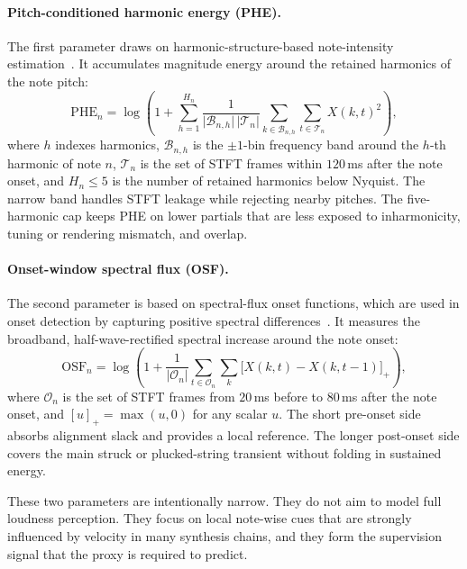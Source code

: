 \paragraph{Pitch-conditioned harmonic energy (PHE).}
The first parameter draws on harmonic-structure-based note-intensity estimation~\cite{ewert2011est}. It accumulates magnitude energy around the retained harmonics of the note pitch:
\begin{equation}
\label{eq:bp_phe}
\mathrm{PHE}_n =
\log\!\left(1 + \sum_{h=1}^{H_n}
\frac{1}{\lvert\mathcal{B}_{n,h}\rvert\,\lvert\mathcal{T}_n\rvert}
\sum_{k \in \mathcal{B}_{n,h}} \sum_{t \in \mathcal{T}_n} X(k,t)^2 \right),
\end{equation}
where $h$ indexes harmonics, $\mathcal{B}_{n,h}$ is the $\pm 1$-bin frequency band around the $h$-th harmonic of note $n$, $\mathcal{T}_n$ is the set of STFT frames within $120$\,ms after the note onset, and $H_n \le 5$ is the number of retained harmonics below Nyquist. The narrow band handles STFT leakage while rejecting nearby pitches. The five-harmonic cap keeps PHE on lower partials that are less exposed to inharmonicity, tuning or rendering mismatch, and overlap.

\paragraph{Onset-window spectral flux (OSF).}
The second parameter is based on spectral-flux onset functions, which are used in onset detection by capturing positive spectral differences~\cite{dixon2006onset, boeck2013maximum}. It measures the broadband, half-wave-rectified spectral increase around the note onset:
\begin{equation}
\label{eq:bp_osf}
\mathrm{OSF}_n =
\log\!\left(1 + \frac{1}{\lvert\mathcal{O}_n\rvert}
\sum_{t \in \mathcal{O}_n} \sum_k \bigl[ X(k,t) - X(k,t-1) \bigr]_+ \right),
\end{equation}
where $\mathcal{O}_n$ is the set of STFT frames from $20$\,ms before to $80$\,ms after the note onset, and $[u]_+ = \max(u, 0)$ for any scalar $u$. The short pre-onset side absorbs alignment slack and provides a local reference. The longer post-onset side covers the main struck or plucked-string transient without folding in sustained energy.

These two parameters are intentionally narrow. They do not aim to model full loudness perception. They focus on local note-wise cues that are strongly influenced by velocity in many synthesis chains, and they form the supervision signal that the proxy is required to predict.

